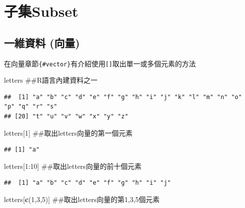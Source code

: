 \documentclass[]{book}
\newenvironment{Shaded}{\begin{snugshade}}{\end{snugshade}}
\newcommand{\KeywordTok}[1]{\textcolor[rgb]{0.13,0.29,0.53}{\textbf{{#1}}}}
\newcommand{\DecValTok}[1]{\textcolor[rgb]{0.00,0.00,0.81}{{#1}}}
\newcommand{\NormalTok}[1]{{#1}}
\theoremstyle{definition}
\theoremstyle{definition}
\theoremstyle{remark}
\begin{document}
\section{子集Subset}\label{subset}

\subsection{一維資料 (向量)}\label{-}

在向量章節\texttt{\{\#vector\}}有介紹使用\texttt{{[}{]}}取出單一或多個元素的方法

\begin{Shaded}
\begin{Highlighting}[]
\NormalTok{letters ##R語言內建資料之一}
\end{Highlighting}
\end{Shaded}

\begin{verbatim}
##  [1] "a" "b" "c" "d" "e" "f" "g" "h" "i" "j" "k" "l" "m" "n" "o" "p" "q" "r" "s"
## [20] "t" "u" "v" "w" "x" "y" "z"
\end{verbatim}

\begin{Shaded}
\begin{Highlighting}[]
\NormalTok{letters[}\DecValTok{1}\NormalTok{] ##取出letters向量的第一個元素}
\end{Highlighting}
\end{Shaded}

\begin{verbatim}
## [1] "a"
\end{verbatim}

\begin{Shaded}
\begin{Highlighting}[]
\NormalTok{letters[}\DecValTok{1}\NormalTok{:}\DecValTok{10}\NormalTok{] ##取出letters向量的前十個元素}
\end{Highlighting}
\end{Shaded}

\begin{verbatim}
##  [1] "a" "b" "c" "d" "e" "f" "g" "h" "i" "j"
\end{verbatim}

\begin{Shaded}
\begin{Highlighting}[]
\NormalTok{letters[}\KeywordTok{c}\NormalTok{(}\DecValTok{1}\NormalTok{,}\DecValTok{3}\NormalTok{,}\DecValTok{5}\NormalTok{)] ##取出letters向量的第1,3,5個元素}
\end{Highlighting}
\end{Shaded}
\end{document}
